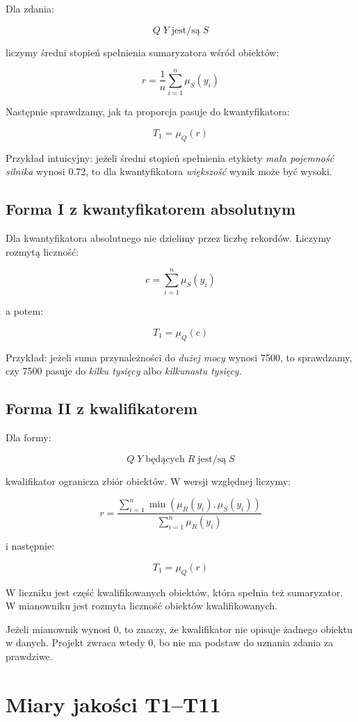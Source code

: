 \documentclass[11pt,a4paper]{article}
\begin{document}
Dla zdania:

\[
Q\;Y\;\text{jest/są}\;S
\]

liczymy średni stopień spełnienia sumaryzatora wśród obiektów:

\[
r = \frac{1}{n}\sum_{i=1}^{n}\mu_S(y_i)
\]

Następnie sprawdzamy, jak ta proporcja pasuje do kwantyfikatora:

\[
T_1 = \mu_Q(r)
\]

Przykład intuicyjny: jeżeli średni stopień spełnienia etykiety \emph{mała pojemność silnika} wynosi 0.72, to dla kwantyfikatora \emph{większość} wynik może być wysoki.

\subsection{Forma I z kwantyfikatorem absolutnym}

Dla kwantyfikatora absolutnego nie dzielimy przez liczbę rekordów. Liczymy rozmytą liczność:

\[
c = \sum_{i=1}^{n}\mu_S(y_i)
\]

a potem:

\[
T_1 = \mu_Q(c)
\]

Przykład: jeżeli suma przynależności do \emph{dużej mocy} wynosi 7500, to sprawdzamy, czy 7500 pasuje do \emph{kilku tysięcy} albo \emph{kilkunastu tysięcy}.

\subsection{Forma II z kwalifikatorem}

Dla formy:

\[
Q\;Y\;\text{będących}\;R\;\text{jest/są}\;S
\]

kwalifikator ogranicza zbiór obiektów. W wersji względnej liczymy:

\[
r = \frac{\sum_{i=1}^{n}\min(\mu_R(y_i), \mu_S(y_i))}
{\sum_{i=1}^{n}\mu_R(y_i)}
\]

i następnie:

\[
T_1 = \mu_Q(r)
\]

W liczniku jest część kwalifikowanych obiektów, która spełnia też sumaryzator. W mianowniku jest rozmyta liczność obiektów kwalifikowanych.

Jeżeli mianownik wynosi 0, to znaczy, że kwalifikator nie opisuje żadnego obiektu w danych. Projekt zwraca wtedy 0, bo nie ma podstaw do uznania zdania za prawdziwe.

\section{Miary jakości T1--T11}
\end{document}
